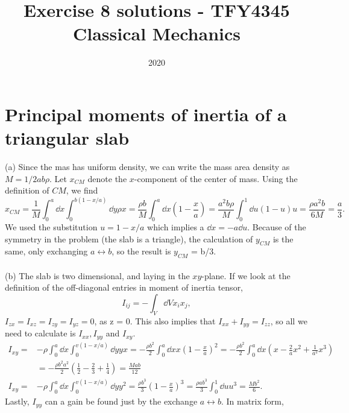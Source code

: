 \documentclass{article}
\title{Exercise 8 solutions - TFY4345 Classical Mechanics}
\date{2020}
\begin{document}
    \maketitle
    \section{Principal moments of inertia of a triangular slab}
        (a) Since the mas has uniform density, we can write the mass area density as $M =   1/2 ab\rho$. Let $x_{CM}$ denote the $x$-component of the center of mass. Using the definition of $CM$, we find
        \begin{equation*}
            x_{CM} = \frac{1}{M} \int_0^a \dd x \int_0^{b(1 - x / a)} \dd y \rho x = \frac{\rho b}{M} \int_0^a \dd x \left( 1 - \frac{x}{a}\right) = \frac{a^2 b \rho}{M} \int_0^1 \dd u (1 - u)u = \frac{\rho a^2 b}{6M} = \frac{a}{3}. 
        \end{equation*}
        We used the substitution $u = 1 - x/a$ which implies a $ \dd x = - a \dd u $. Because of the symmetry in the problem (the slab is a triangle), the calculation of $y_{CM}$ is the same, only exchanging $ a \leftrightarrow b $, so the result is $y_{CM}$ = b/3. 
        \\ \\
        (b) The slab is two dimensional, and laying in the $xy$-plane. If we look at the definition of the off-diagonal entries in moment of inertia tensor,
        \begin{equation*}
            I_{ij} = - \int_V \dd V x_ix_j,
        \end{equation*} $I_{zx} = I_{xz} = I_{zy} = I_{yz} = 0$, as  z = 0. This also implies that $I_{xx} + I_{yy} = I_{zz}$, so all we need to calculate is $I_{xx}, I_{yy}$ and $I_{xy}$.
        \begin{align*}
            I_{xy} =& -\rho \int_0^a \dd x \int_0^{v(1 - x/a)} \dd y yx = - \frac{\rho b^2}{2}\int_0^a \dd x x \left( 1 - \frac{x}{a} \right)^2 = - \frac{\rho b^2}{2} \int_0^a \dd x \left( x - \frac{2}{a}x^2 + \frac{1}{a^2} x^3\right) \\
            &= -\frac{\rho b^2 a^2}{2}\left( \frac{1}{2} - \frac{2}{3} + \frac{1}{4} \right) = \frac{M a b}{12} \\
            I_{xy} = & -\rho \int_0^a \dd x \int_0^{v(1 - x/a)} \dd y y^2 = \frac{\rho b^3}{3}
            \left(1 - \frac{x}{a}\right)^3 = \frac{\rho a b^3}{3} \int_0^1 \dd u u^3 = \frac{M b^2}{6}.
        \end{align*} 
        Lastly, $I_{yy}$ can a gain be found just by the exchange $a \leftrightarrow b$. In matrix form,
\end{document}
